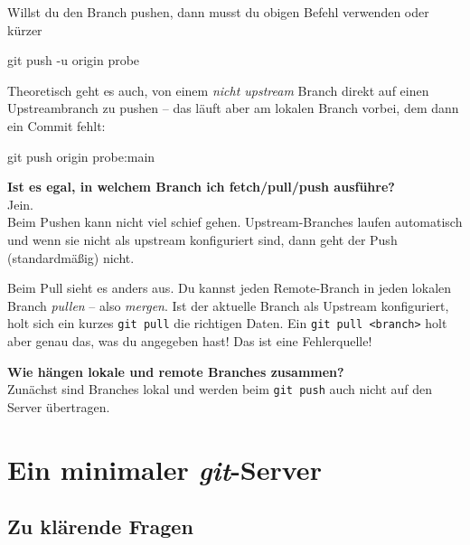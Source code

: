 \documentclass[
  letterpaper,
  DIV=11]{scrreprt}
\newenvironment{Shaded}{\begin{snugshade}}{\end{snugshade}}
\newcommand{\AttributeTok}[1]{\textcolor[rgb]{0.40,0.45,0.13}{#1}}
\newcommand{\FunctionTok}[1]{\textcolor[rgb]{0.28,0.35,0.67}{#1}}
\newcommand{\NormalTok}[1]{\textcolor[rgb]{0.00,0.23,0.31}{#1}}
\newcommand{\cmd}[1]{\texttt{#1}\xspace}
\newcommand{\git}{\textit{git}\xspace}
\begin{document}
Willst du den Branch pushen, dann musst du obigen Befehl verwenden oder
kürzer

\begin{Shaded}
\begin{Highlighting}[]
\FunctionTok{git}\NormalTok{ push }\AttributeTok{{-}u}\NormalTok{ origin probe }
\end{Highlighting}
\end{Shaded}

Theoretisch geht es auch, von einem \emph{nicht upstream} Branch direkt
auf einen Upstreambranch zu pushen -- das läuft aber am lokalen Branch
vorbei, dem dann ein Commit fehlt:

\begin{Shaded}
\begin{Highlighting}[]
\FunctionTok{git}\NormalTok{ push origin probe:main }
\end{Highlighting}
\end{Shaded}

\textbf{Ist es egal, in welchem Branch ich fetch/pull/push ausführe?}\\
Jein.\\
Beim Pushen kann nicht viel schief gehen. Upstream-Branches laufen
automatisch und wenn sie nicht als upstream konfiguriert sind, dann geht
der Push (standardmäßig) nicht.

Beim Pull sieht es anders aus. Du kannst jeden Remote-Branch in jeden
lokalen Branch \emph{pullen} -- also \emph{mergen}. Ist der aktuelle
Branch als Upstream konfiguriert, holt sich ein kurzes \cmd{git pull}
die richtigen Daten. Ein \cmd{git pull <branch>} holt aber genau das,
was du angegeben hast! Das ist eine Fehlerquelle!

\textbf{Wie hängen lokale und remote Branches zusammen?}\\
Zunächst sind Branches lokal und werden beim \cmd{git push} auch nicht
auf den Server übertragen.


\chapter{\texorpdfstring{Ein minimaler
\git-Server}{Ein minimaler -Server}}\label{ein-minimaler--server}

\section{Zu klärende Fragen}\label{zu-kluxe4rende-fragen}
\end{document}
